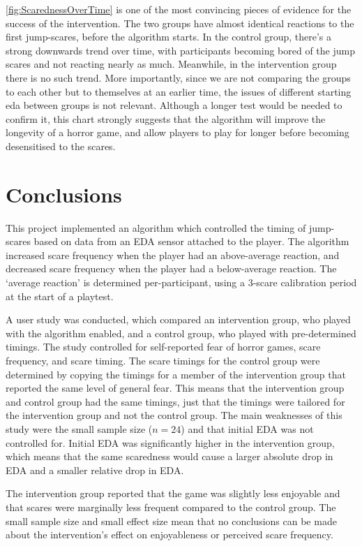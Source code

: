 \documentclass[12pt,a4paper]{article}\usepackage[]{graphicx}\usepackage[]{color}
\begin{document}
\vref{fig:ScarednessOverTime} is one of the most convincing pieces of evidence for the success of the intervention.
The two groups have almost identical reactions to the first jump-scares, before the algorithm starts.
In the control group, there's a strong downwards trend over time, with participants becoming bored of the jump scares and not reacting nearly as much.
Meanwhile, in the intervention group there is no such trend.
More importantly, since we are not comparing the groups to each other but to themselves at an earlier time, the issues of different starting eda between groups is not relevant.
Although a longer test would be needed to confirm it, this chart strongly suggests that the algorithm will improve the longevity of a horror game, and allow players to play for longer before becoming desensitised to the scares.

\section{Conclusions}

This project implemented an algorithm which controlled the timing of jump-scares based on data from an EDA sensor attached to the player.
The algorithm increased scare frequency when the player had an above-average reaction, and decreased scare frequency when the player had a below-average reaction.
The `average reaction' is determined per-participant, using a 3-scare calibration period at the start of a playtest.

A user study was conducted, which compared an intervention group, who played with the algorithm enabled, and a control group, who played with pre-determined timings.
The study controlled for self-reported fear of horror games, scare frequency, and scare timing.
The scare timings for the control group were determined by copying the timings for a member of the intervention group that reported the same level of general fear.
This means that the intervention group and control group had the same timings, just that the timings were tailored for the intervention group and not the control group.
The main weaknesses of this study were the small sample size ($n=24$) and that initial EDA was not controlled for.
Initial EDA was significantly higher in the intervention group, which means that the same scaredness would cause a larger absolute drop in EDA and a smaller relative drop in EDA.

The intervention group reported that the game was slightly less enjoyable and that scares were marginally less frequent compared to the control group.
The small sample size and small effect size mean that no conclusions can be made about the intervention's effect on enjoyableness or perceived scare frequency.
\end{document}
